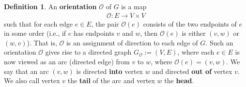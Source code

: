\documentclass[12pt]{article}
\theoremstyle{definition}
\newtheorem{definition}[theorem]{Definition}
\theoremstyle{remark}
\newcommand{\tup}[1]{\left( #1 \right)}
\newcommand{\Or}{\mathcal{O}}
\begin{document}
\begin{definition}
    An \textbf{orientation} $\mathcal{O}$ of $G$ is a map
    \begin{align*}
        \mathcal{O} : E \to V \times V
    \end{align*}
    such that for each edge $e \in E$, the pair $\Or\tup{e}$ consists of the two endpoints of $e$ in some order (i.e., if $e$ has endpoints $v$ and $w$, then $\Or\tup{e}$ is either $\tup{v,w}$ or $\tup{w,v}$).
    That is, $\mathcal{O}$ is an assignment of direction to each edge of $G$.
    Such an orientation $\Or$ gives rise to a directed graph $G_{\mathcal{O}} := \tup{V,E}$, where each $e \in E$ is now viewed as an arc (directed edge) from $v$ to $w$, where $\Or\tup{e} = \tup{v,w}$.
    We say that an arc $(v,w)$ is directed \textbf{into} vertex $w$ and directed \textbf{out of} vertex $v$. We also call vertex $v$ the \textbf{tail} of the arc and vertex $w$ the \textbf{head}.
\end{definition}
\end{document}
